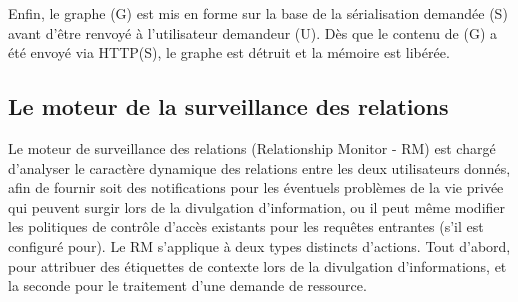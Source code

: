 Enfin, le graphe (G) est mis en forme sur la base de la sérialisation demandée (S) avant d'être renvoyé à l'utilisateur demandeur (U). Dès que le contenu de (G) a été envoyé via HTTP(S), le graphe est détruit et la mémoire est libérée.

\subsection*{Le moteur de la surveillance des relations}
Le moteur de surveillance des relations (Relationship Monitor - RM) est chargé d'analyser le caractère dynamique des relations entre les deux utilisateurs donnés, afin de fournir soit des notifications pour les éventuels problèmes de la vie privée qui peuvent surgir lors de la divulgation d'information, ou il peut même modifier les politiques de contrôle d'accès existants pour les requêtes entrantes (s'il est configuré pour). Le RM s'applique à deux types distincts d'actions. Tout d'abord, pour attribuer des étiquettes de contexte lors de la divulgation d'informations, et la seconde pour le traitement d'une demande de ressource.\\


